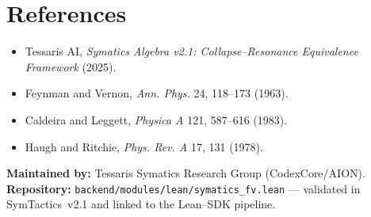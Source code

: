 \documentclass[12pt]{article}
\begin{document}
\section*{References}

\begin{itemize}[noitemsep]
  \item Tessaris AI, \emph{Symatics Algebra v2.1: Collapse–Resonance Equivalence Framework} (2025).
  \item Feynman and Vernon, \emph{Ann. Phys.} 24, 118–173 (1963).
  \item Caldeira and Leggett, \emph{Physica A} 121, 587–616 (1983).
  \item Haugh and Ritchie, \emph{Phys. Rev. A} 17, 131 (1978).
\end{itemize}

\bigskip
\noindent
\textbf{Maintained by:} Tessaris Symatics Research Group (CodexCore/AION).\\
\textbf{Repository:} \texttt{backend/modules/lean/symatics\_fv.lean}  
— validated in SymTactics~v2.1 and linked to the Lean–SDK pipeline.
\end{document}
